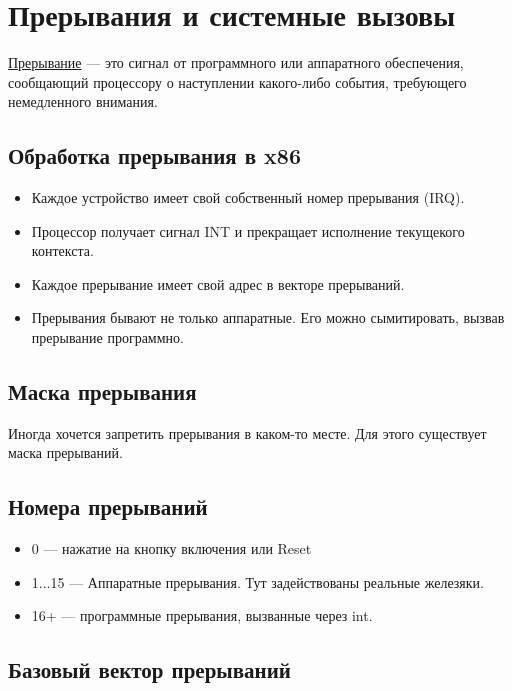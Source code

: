 \section{Прерывания и системные вызовы}

\begin{Def}
	\underline{Прерывание} --- это сигнал от программного или аппаратного обеспечения,
	сообщающий процессору о наступлении какого-либо события, требующего немедленного внимания.
\end{Def}

\subsection{Обработка прерывания в x86}

\begin{itemize}
	\item Каждое устройство имеет свой собственный номер прерывания (IRQ).
	\item Процессор получает сигнал INT и прекращает исполнение текущекого контекста.
	\item Каждое прерывание имеет свой адрес в векторе прерываний.
	\item Прерывания бывают не только аппаратные. Его можно сымитировать, 
	вызвав прерывание программно.
\end{itemize}

\subsection{Маска прерывания}

Иногда хочется запретить прерывания в каком-то месте. Для этого существует маска прерываний.

\subsection{Номера прерываний}

\begin{itemize}
	\item 0 --- нажатие на кнопку включения или Reset
	\item 1...15 --- Аппаратные прерывания. Тут задействованы реальные железяки.
	\item 16+ --- программные прерывания, вызванные через int.
\end{itemize}

\subsection{Базовый вектор прерываний}

